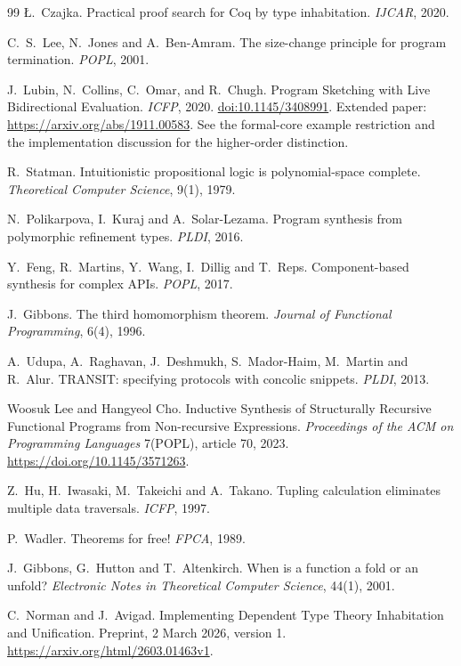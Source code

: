 \begin{thebibliography}{99}
 \L.~Czajka. Practical proof search for Coq by type inhabitation. \emph{IJCAR}, 2020.

 C.~S.~Lee, N.~Jones and A.~Ben-Amram. The size-change principle for program termination. \emph{POPL}, 2001.

 J.~Lubin, N.~Collins, C.~Omar, and R.~Chugh.
Program Sketching with Live Bidirectional Evaluation.
\emph{ICFP}, 2020.
\href{https://doi.org/10.1145/3408991}{doi:10.1145/3408991}.
Extended paper: \url{https://arxiv.org/abs/1911.00583}.
See the formal-core example restriction and the implementation discussion
for the higher-order distinction.

 R.~Statman. Intuitionistic propositional logic is polynomial-space complete. \emph{Theoretical Computer Science}, 9(1), 1979.

 N.~Polikarpova, I.~Kuraj and A.~Solar-Lezama. Program synthesis from polymorphic refinement types. \emph{PLDI}, 2016.

 Y.~Feng, R.~Martins, Y.~Wang, I.~Dillig and T.~Reps. Component-based synthesis for complex APIs. \emph{POPL}, 2017.

 J.~Gibbons. The third homomorphism theorem. \emph{Journal of Functional Programming}, 6(4), 1996.

 A.~Udupa, A.~Raghavan, J.~Deshmukh, S.~Mador-Haim, M.~Martin and R.~Alur. TRANSIT: specifying protocols with concolic snippets. \emph{PLDI}, 2013.

 Woosuk Lee and Hangyeol Cho. Inductive Synthesis of Structurally Recursive
Functional Programs from Non-recursive Expressions.
\emph{Proceedings of the ACM on Programming Languages} 7(POPL), article 70, 2023.
\url{https://doi.org/10.1145/3571263}.

 Z.~Hu, H.~Iwasaki, M.~Takeichi and A.~Takano. Tupling calculation eliminates multiple data traversals. \emph{ICFP}, 1997.

 P.~Wadler. Theorems for free! \emph{FPCA}, 1989.

 J.~Gibbons, G.~Hutton and T.~Altenkirch. When is a function a fold or an unfold? \emph{Electronic Notes in Theoretical Computer Science}, 44(1), 2001.

 C.~Norman and J.~Avigad.
Implementing Dependent Type Theory Inhabitation and Unification.
Preprint, 2 March 2026, version 1.
\url{https://arxiv.org/html/2603.01463v1}.


\end{thebibliography}
